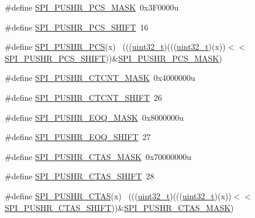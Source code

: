\begin{DoxyCompactItemize}
\item 
\#define \hyperlink{group___s_p_i___register___masks_gae2a7d0ea8a143281112074fe3745a70c}{S\+P\+I\+\_\+\+P\+U\+S\+H\+R\+\_\+\+P\+C\+S\+\_\+\+M\+A\+SK}~0x3\+F0000u
\item 
\#define \hyperlink{group___s_p_i___register___masks_gafb0dfe436cd6273ce0b0052aca58499e}{S\+P\+I\+\_\+\+P\+U\+S\+H\+R\+\_\+\+P\+C\+S\+\_\+\+S\+H\+I\+FT}~16
\item 
\#define \hyperlink{group___s_p_i___register___masks_ga162a162d80d66bcf7f8ad20f5458330a}{S\+P\+I\+\_\+\+P\+U\+S\+H\+R\+\_\+\+P\+CS}(x)                                              ~(((\hyperlink{_p_e___types_8h_a33594304e786b158f3fb30289278f5af}{uint32\+\_\+t})(((\hyperlink{_p_e___types_8h_a33594304e786b158f3fb30289278f5af}{uint32\+\_\+t})(x))$<$$<$\hyperlink{group___s_p_i___register___masks_gafb0dfe436cd6273ce0b0052aca58499e}{S\+P\+I\+\_\+\+P\+U\+S\+H\+R\+\_\+\+P\+C\+S\+\_\+\+S\+H\+I\+FT}))\&\hyperlink{group___s_p_i___register___masks_gae2a7d0ea8a143281112074fe3745a70c}{S\+P\+I\+\_\+\+P\+U\+S\+H\+R\+\_\+\+P\+C\+S\+\_\+\+M\+A\+SK})
\item 
\#define \hyperlink{group___s_p_i___register___masks_gad9e8859d590a59f5e208f5f4a2c8b873}{S\+P\+I\+\_\+\+P\+U\+S\+H\+R\+\_\+\+C\+T\+C\+N\+T\+\_\+\+M\+A\+SK}~0x4000000u
\item 
\#define \hyperlink{group___s_p_i___register___masks_ga7db8f0d7ae83f27f34eafd5e4d993ed1}{S\+P\+I\+\_\+\+P\+U\+S\+H\+R\+\_\+\+C\+T\+C\+N\+T\+\_\+\+S\+H\+I\+FT}~26
\item 
\#define \hyperlink{group___s_p_i___register___masks_ga997edfebb20bfe6a385f018eb9a8a8fb}{S\+P\+I\+\_\+\+P\+U\+S\+H\+R\+\_\+\+E\+O\+Q\+\_\+\+M\+A\+SK}~0x8000000u
\item 
\#define \hyperlink{group___s_p_i___register___masks_ga81e193cbd4602af43cd59a35e56fa958}{S\+P\+I\+\_\+\+P\+U\+S\+H\+R\+\_\+\+E\+O\+Q\+\_\+\+S\+H\+I\+FT}~27
\item 
\#define \hyperlink{group___s_p_i___register___masks_ga3ac8018fdfe57c16da2782e99232ae45}{S\+P\+I\+\_\+\+P\+U\+S\+H\+R\+\_\+\+C\+T\+A\+S\+\_\+\+M\+A\+SK}~0x70000000u
\item 
\#define \hyperlink{group___s_p_i___register___masks_ga16a0810e65793ba9f24a5ae8be8cf49a}{S\+P\+I\+\_\+\+P\+U\+S\+H\+R\+\_\+\+C\+T\+A\+S\+\_\+\+S\+H\+I\+FT}~28
\item 
\#define \hyperlink{group___s_p_i___register___masks_gac2446ecf47a72694699c44e9c0f92997}{S\+P\+I\+\_\+\+P\+U\+S\+H\+R\+\_\+\+C\+T\+AS}(x)                                            ~(((\hyperlink{_p_e___types_8h_a33594304e786b158f3fb30289278f5af}{uint32\+\_\+t})(((\hyperlink{_p_e___types_8h_a33594304e786b158f3fb30289278f5af}{uint32\+\_\+t})(x))$<$$<$\hyperlink{group___s_p_i___register___masks_ga16a0810e65793ba9f24a5ae8be8cf49a}{S\+P\+I\+\_\+\+P\+U\+S\+H\+R\+\_\+\+C\+T\+A\+S\+\_\+\+S\+H\+I\+FT}))\&\hyperlink{group___s_p_i___register___masks_ga3ac8018fdfe57c16da2782e99232ae45}{S\+P\+I\+\_\+\+P\+U\+S\+H\+R\+\_\+\+C\+T\+A\+S\+\_\+\+M\+A\+SK})

\end{DoxyCompactItemize}
